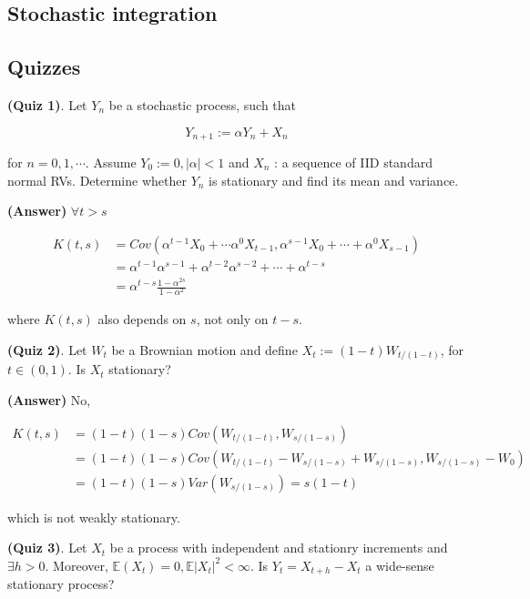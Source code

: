 \documentclass[12pt]{article}
\theoremstyle{nonumberbreak}
\begin{document}
\subsection{Stochastic integration}






\subsection*{Quizzes}

\textbf{(Quiz 1)}. Let $Y_n$ be a stochastic process, such that

$$
Y_{n+1} := \alpha Y_n + X_n
$$

for $n=0, 1, \cdots$. Assume $Y_0 := 0, |\alpha| < 1$ and $X_n$ : a sequence of IID standard normal RVs. Determine whether $Y_n$ is stationary and find its mean and variance.


\textbf{(Answer)} $\forall t > s$

$$
\begin{aligned}
K(t,s) &= Cov(\alpha^{t-1} X_0 + \cdots \alpha^0 X_{t-1}, \alpha^{s-1} X_0 + \cdots + \alpha^0 X_{s-1}) \\[8pt]
&= \alpha^{t-1} \alpha^{s-1} + \alpha^{t-2} \alpha^{s-2} + \cdots + \alpha^{t-s} \\[8pt]
&= \alpha^{t-s} \frac{1-\alpha^{2s}}{1-\alpha^2}
\end{aligned}
$$

where $K(t,s)$ also depends on $s$, not only on $t-s$.




\textbf{(Quiz 2)}. Let $W_t$ be a Brownian motion and define $X_t := (1-t) W_{t/(1-t)}$, for $t \in (0,1)$. Is $X_t$ stationary? 

\textbf{(Answer)} No,

$$
\begin{aligned}
K(t,s) &= (1-t)(1-s) Cov(W_{t/(1-t)}, W_{s/(1-s)}) \\[8pt]
&= (1-t)(1-s) Cov(W_{t/(1-t)} - W_{s/(1-s)} + W_{s/(1-s)}, W_{s/(1-s)} - W_0) \\[8pt]
&= (1-t)(1-s) Var(W_{s/(1-s)}) = s(1-t)
\end{aligned}
$$

which is not weakly stationary. 


\textbf{(Quiz 3)}. Let $X_t$ be a process with independent and stationry increments and $\exists h>0$. Moreover, $\mathbb{E}(X_t) = 0, \mathbb{E}|X_t|^2 < \infty$. Is $Y_t = X_{t+h} - X_t$ a wide-sense stationary process? 
\end{document}
